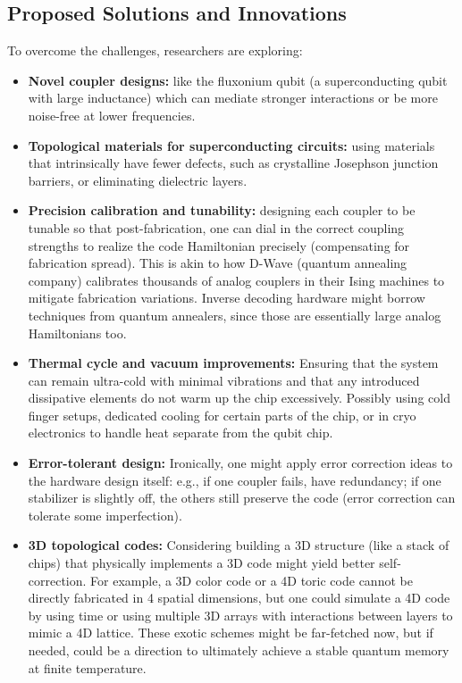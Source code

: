 \documentclass[11pt]{article}
\begin{document}
\subsection{Proposed Solutions and Innovations}
To overcome the challenges, researchers are exploring:
\begin{itemize}
    \item \textbf{Novel coupler designs:} like the fluxonium qubit (a superconducting qubit with large inductance) which can mediate stronger interactions or be more noise-free at lower frequencies. 
    \item \textbf{Topological materials for superconducting circuits:} using materials that intrinsically have fewer defects, such as crystalline Josephson junction barriers, or eliminating dielectric layers.
    \item \textbf{Precision calibration and tunability:} designing each coupler to be tunable so that post-fabrication, one can dial in the correct coupling strengths to realize the code Hamiltonian precisely (compensating for fabrication spread). This is akin to how D-Wave (quantum annealing company) calibrates thousands of analog couplers in their Ising machines to mitigate fabrication variations. Inverse decoding hardware might borrow techniques from quantum annealers, since those are essentially large analog Hamiltonians too.
    \item \textbf{Thermal cycle and vacuum improvements:} Ensuring that the system can remain ultra-cold with minimal vibrations and that any introduced dissipative elements do not warm up the chip excessively. Possibly using cold finger setups, dedicated cooling for certain parts of the chip, or in cryo electronics to handle heat separate from the qubit chip.
    \item \textbf{Error-tolerant design:} Ironically, one might apply error correction ideas to the hardware design itself: e.g., if one coupler fails, have redundancy; if one stabilizer is slightly off, the others still preserve the code (error correction can tolerate some imperfection).
    \item \textbf{3D topological codes:} Considering building a 3D structure (like a stack of chips) that physically implements a 3D code might yield better self-correction. For example, a 3D color code or a 4D toric code cannot be directly fabricated in 4 spatial dimensions, but one could simulate a 4D code by using time or using multiple 3D arrays with interactions between layers to mimic a 4D lattice. These exotic schemes might be far-fetched now, but if needed, could be a direction to ultimately achieve a stable quantum memory at finite temperature.
\end{itemize}
\end{document}
